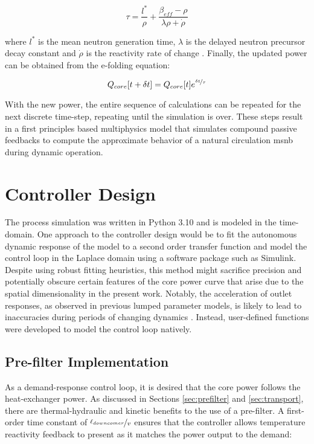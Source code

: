 \begin{equation}
    \tau = \frac{l^{*}}{\rho}
         +\frac{\beta_{eff}-\rho}{\lambda\rho + \dot{\rho}}
\end{equation}

where $l^{*}$ is the mean neutron generation time, $\lambda$ is the delayed neutron precursor decay constant and $\dot{\rho}$ is the reactivity rate of change \cite[Ch. 6]{DH}. Finally, the updated power can be obtained from the e-folding equation:

\begin{equation}
    Q_{core}[t+\delta t] = Q_{core}[t] e^{\nicefrac{\delta t}{\tau}}
\end{equation}

With the new power, the entire sequence of calculations can be repeated for the next discrete time-step, repeating until the simulation is over. These steps result in a first principles based multiphysics model that simulates compound passive feedbacks to compute the approximate behavior of a natural circulation \acs{msnb} during dynamic operation.

\section{Controller Design}
\label{Section:Design}

The process simulation was written in Python 3.10 and is modeled in the time-domain. One approach to the controller design would be to fit the autonomous dynamic response of the model to a second order transfer function and model the control loop in the Laplace domain using a software package such as Simulink. Despite using robust fitting heuristics, this method might sacrifice precision and potentially obscure certain features of the core power curve that arise due to the spatial dimensionality in the present work.  Notably, the acceleration of outlet responses, as observed in previous lumped parameter models, is likely to lead to inaccuracies during periods of changing dynamics \cite{msreSimulink}. Instead, user-defined functions were developed to model the control loop natively.

\subsection{Pre-filter Implementation}
As a demand-response control loop, it is desired that the core power follows the heat-exchanger power. As discussed in Sections \ref{sec:prefilter} and \ref{sec:transport}, there are thermal-hydraulic and kinetic benefits to the use of a pre-filter. A first-order time constant of $\nicefrac{\ell_{downcomer}}{v}$ ensures that the controller allows temperature reactivity feedback to present as it matches the power output to the demand:

